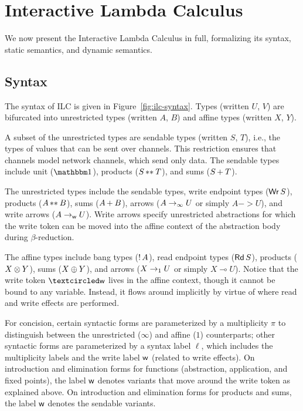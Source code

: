 
%



\section{Interactive Lambda Calculus}
\label{sec:ilc}

We now present the Interactive Lambda Calculus in full, formalizing its syntax,
static semantics, and dynamic semantics.

\subsection{Syntax}
\label{subsec:syntax}

The syntax of ILC is given in Figure~\ref{fig:ilc-syntax}. Types (written $U$,
$V$) are bifurcated into unrestricted types (written $A$, $B$) and affine
types (written $X$, $Y$).

A subset of the unrestricted types are sendable types (written $S$, $T$),
i.e., the types of values that can be sent over channels. This restriction
ensures that channels model network channels, which send only data. The sendable
types include unit ($\tyUnit$), products (${S}\, {**}_{}\, {T}$), and sums
(${S}\, {+}_{}\, {T}$).

The unrestricted types include the sendable types, write endpoint types
($\textnormal{\textsf{Wr}}\,S$), products (${A}\, {**}_{}\, {B}$), sums (${A}\, {+}_{}\, {B}$), arrows
(${A}\rightarrow_{\infty}{U}$ or simply $A -> U$), and write arrows
(${A}\rightarrow_{\textsf{w}}{U}$). Write arrows specify unrestricted abstractions for
which the write token can be moved into the affine context of the abstraction
body during $\beta$-reduction.

The affine types include bang types (${!}\,{A}$), read endpoint types
($\textnormal{\textsf{Rd}}\,S$), products (${X}\otimes{Y}$), sums (${X}\oplus{Y}$), and arrows
(${X}\rightarrow_{1}{U}$ or simply $X \multimap U$). Notice that the write token $\wrtok$
lives in the affine context, though it cannot be bound to any variable. Instead,
it flows around implicitly by virtue of where read and write effects are
performed.

For concision, certain syntactic forms are parameterized by a multiplicity $\pi$
to distinguish between the unrestricted ($\infty$) and affine ($1$)
counterparts; other syntactic forms are parameterized by a syntax label $\ell$,
which includes the multiplicity labels and the write label $\textsf{w}$ (related to
write effects). On introduction and elimination forms for functions
(abstraction, application, and fixed points), the label $\textsf{w}$ denotes variants
that move around the write token as explained above. On introduction and
elimination forms for products and sums, the label $\textsf{w}$ denotes the sendable variants.


